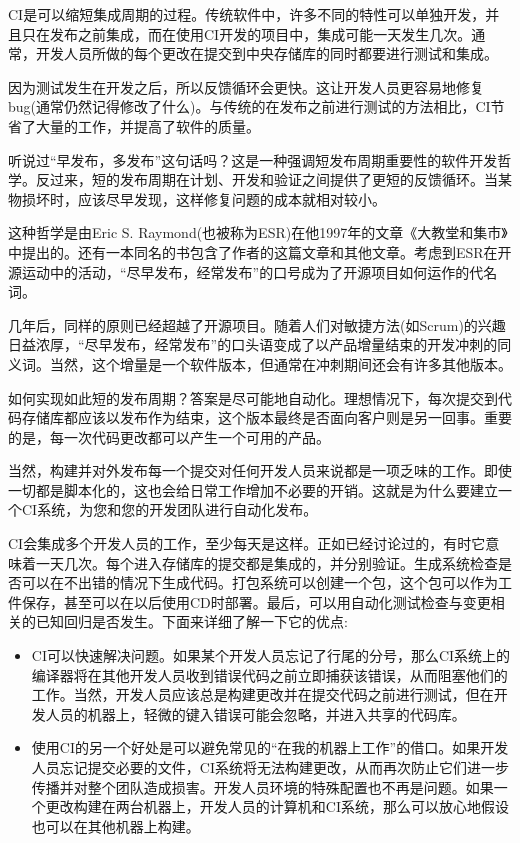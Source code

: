 CI是可以缩短集成周期的过程。传统软件中，许多不同的特性可以单独开发，并且只在发布之前集成，而在使用CI开发的项目中，集成可能一天发生几次。通常，开发人员所做的每个更改在提交到中央存储库的同时都要进行测试和集成。

因为测试发生在开发之后，所以反馈循环会更快。这让开发人员更容易地修复bug(通常仍然记得修改了什么)。与传统的在发布之前进行测试的方法相比，CI节省了大量的工作，并提高了软件的质量。


听说过“早发布，多发布”这句话吗？这是一种强调短发布周期重要性的软件开发哲学。反过来，短的发布周期在计划、开发和验证之间提供了更短的反馈循环。当某物损坏时，应该尽早发现，这样修复问题的成本就相对较小。

这种哲学是由Eric S. Raymond(也被称为ESR)在他1997年的文章《大教堂和集市》中提出的。还有一本同名的书包含了作者的这篇文章和其他文章。考虑到ESR在开源运动中的活动，“尽早发布，经常发布”的口号成为了开源项目如何运作的代名词。

几年后，同样的原则已经超越了开源项目。随着人们对敏捷方法(如Scrum)的兴趣日益浓厚，“尽早发布，经常发布”的口头语变成了以产品增量结束的开发冲刺的同义词。当然，这个增量是一个软件版本，但通常在冲刺期间还会有许多其他版本。

如何实现如此短的发布周期？答案是尽可能地自动化。理想情况下，每次提交到代码存储库都应该以发布作为结束，这个版本最终是否面向客户则是另一回事。重要的是，每一次代码更改都可以产生一个可用的产品。

当然，构建并对外发布每一个提交对任何开发人员来说都是一项乏味的工作。即使一切都是脚本化的，这也会给日常工作增加不必要的开销。这就是为什么要建立一个CI系统，为您和您的开发团队进行自动化发布。


CI会集成多个开发人员的工作，至少每天是这样。正如已经讨论过的，有时它意味着一天几次。每个进入存储库的提交都是集成的，并分别验证。生成系统检查是否可以在不出错的情况下生成代码。打包系统可以创建一个包，这个包可以作为工件保存，甚至可以在以后使用CD时部署。最后，可以用自动化测试检查与变更相关的已知回归是否发生。下面来详细了解一下它的优点:

\begin{itemize}
\item 
CI可以快速解决问题。如果某个开发人员忘记了行尾的分号，那么CI系统上的编译器将在其他开发人员收到错误代码之前立即捕获该错误，从而阻塞他们的工作。当然，开发人员应该总是构建更改并在提交代码之前进行测试，但在开发人员的机器上，轻微的键入错误可能会忽略，并进入共享的代码库。

\item 
使用CI的另一个好处是可以避免常见的“在我的机器上工作”的借口。如果开发人员忘记提交必要的文件，CI系统将无法构建更改，从而再次防止它们进一步传播并对整个团队造成损害。开发人员环境的特殊配置也不再是问题。如果一个更改构建在两台机器上，开发人员的计算机和CI系统，那么可以放心地假设也可以在其他机器上构建。
\end{itemize}

